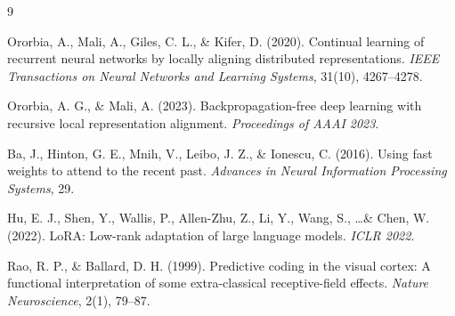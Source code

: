\documentclass[11pt]{article}
\theoremstyle{definition}
\begin{document}

\begin{thebibliography}{9}

Ororbia, A., Mali, A., Giles, C. L., \& Kifer, D. (2020).
Continual learning of recurrent neural networks by locally aligning distributed representations.
\textit{IEEE Transactions on Neural Networks and Learning Systems}, 31(10), 4267--4278.

Ororbia, A. G., \& Mali, A. (2023).
Backpropagation-free deep learning with recursive local representation alignment.
\textit{Proceedings of AAAI 2023}.

Ba, J., Hinton, G. E., Mnih, V., Leibo, J. Z., \& Ionescu, C. (2016).
Using fast weights to attend to the recent past.
\textit{Advances in Neural Information Processing Systems}, 29.

Hu, E. J., Shen, Y., Wallis, P., Allen-Zhu, Z., Li, Y., Wang, S., \ldots \& Chen, W. (2022).
LoRA: Low-rank adaptation of large language models.
\textit{ICLR 2022}.

Rao, R. P., \& Ballard, D. H. (1999).
Predictive coding in the visual cortex: A functional interpretation of some extra-classical receptive-field effects.
\textit{Nature Neuroscience}, 2(1), 79--87.

\end{thebibliography}
\end{document}
